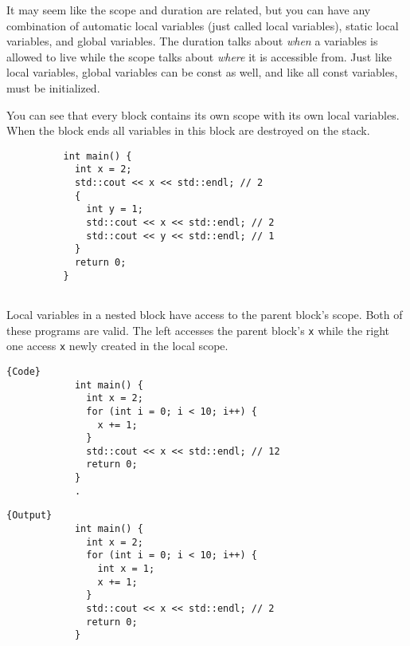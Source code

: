 \documentclass{article}
\begin{document}
      It may seem like the scope and duration are related, but you can have any combination of automatic local variables (just called local variables), static local variables, and global variables. The duration talks about \textit{when} a variables is allowed to live while the scope talks about \textit{where} it is accessible from. Just like local variables, global variables can be const as well, and like all const variables, must be initialized. 

      \begin{example}
        You can see that every block contains its own scope with its own local variables. When the block ends all variables in this block are destroyed on the stack. 

        \begin{lstlisting}
          int main() {  
            int x = 2; 
            std::cout << x << std::endl; // 2
            {
              int y = 1;
              std::cout << x << std::endl; // 2
              std::cout << y << std::endl; // 1
            }
            return 0; 
          }
          
        \end{lstlisting}
      \end{example}

      \begin{example}
        Local variables in a nested block have access to the parent block's scope. Both of these programs are valid. The left accesses the parent block's \texttt{x} while the right one access \texttt{x} newly created in the local scope. 

        \noindent\begin{minipage}{.5\textwidth}
          \begin{lstlisting}[]{Code}
            int main() {  
              int x = 2; 
              for (int i = 0; i < 10; i++) {
                x += 1;
              }
              std::cout << x << std::endl; // 12
              return 0; 
            }
            .
          \end{lstlisting}
          \end{minipage}
          \hfill
          \begin{minipage}{.49\textwidth}
          \begin{lstlisting}[]{Output}
            int main() {  
              int x = 2; 
              for (int i = 0; i < 10; i++) {
                int x = 1;
                x += 1;
              }
              std::cout << x << std::endl; // 2
              return 0; 
            }
          \end{lstlisting}
        \end{minipage}
      \end{example}
\end{document}
